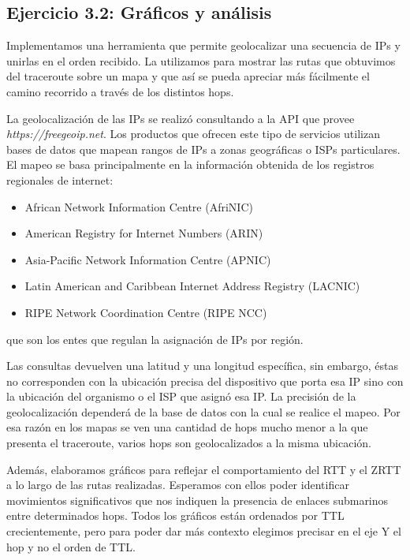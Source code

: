 \subsection{Ejercicio 3.2: Gráficos y análisis}
Implementamos una herramienta que permite geolocalizar una secuencia de IPs y unirlas
en el orden recibido. La utilizamos para mostrar las rutas que obtuvimos del
traceroute sobre un mapa y que así se pueda apreciar más fácilmente el camino
recorrido a través de los distintos hops.\\
\par
La geolocalización de las IPs se realizó consultando a la API que provee \textit{https://freegeoip.net}.
Los productos que ofrecen este tipo de servicios utilizan bases de datos que mapean
rangos de IPs a zonas geográficas o ISPs particulares. El mapeo se basa principalmente
en la información obtenida de los registros regionales de internet:
\begin{itemize}
  \item African Network Information Centre (AfriNIC)
  \item American Registry for Internet Numbers (ARIN)
  \item Asia-Pacific Network Information Centre (APNIC)
  \item Latin American and Caribbean Internet Address Registry (LACNIC)
  \item RIPE Network Coordination Centre (RIPE NCC)
\end{itemize}
que son los entes que regulan la asignación de IPs por región.\\
\par
Las consultas devuelven una latitud y una longitud específica, sin embargo, éstas no
corresponden con la ubicación precisa del dispositivo que porta esa IP sino con la
ubicación del organismo o el ISP que asignó esa IP. La precisión de la geolocalización 
dependerá de la base de datos con la cual se realice el mapeo. Por esa razón en los mapas
se ven una cantidad de hops mucho menor a la que presenta el traceroute, varios hops son
geolocalizados a la misma ubicación.\\
\par
Además, elaboramos gráficos para reflejar el comportamiento del RTT y el ZRTT a lo
largo de las rutas realizadas. Esperamos con ellos poder identificar movimientos
significativos que nos indiquen la presencia de enlaces submarinos entre determinados
hops.
Todos los gráficos están ordenados por TTL crecientemente, pero para poder dar más
contexto elegimos precisar en el eje Y el hop y no el orden de TTL.

